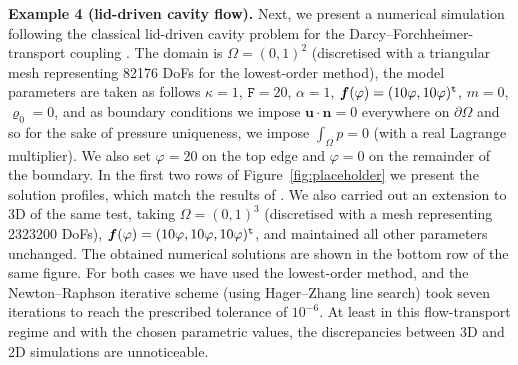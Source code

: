 \documentclass[11pt, reqno, a4paper, twoside]{article}
\newcommand{\bn}{\boldsymbol{n}}
\newcommand{\bu}{\boldsymbol{u}}
\renewcommand{\bf}{\boldsymbol{f}}
\newcommand{\rF}{\mathtt{F}}
\numberwithin{equation}{section}
\numberwithin{remark}{section}
\numberwithin{figure}{section}
\numberwithin{table}{section}
\begin{document}

\smallskip
\noindent\textbf{Example 4 (lid-driven cavity flow).} {Next, we present a numerical simulation following the classical lid-driven cavity problem for the Darcy--Forchheimer-transport coupling \cite{sayah2021finite}. The domain is $\Omega = (0,1)^2$ (discretised with a triangular mesh representing 82176 DoFs for the lowest-order method), the model parameters are taken as follows $\kappa = 1$, $\rF = 20$, $\alpha = 1$, $\bf(\varphi) = (10\varphi,10\varphi)^{\tt t}$, $m = 0$, $\varrho_0 = 0$, and as boundary conditions we impose $\bu \cdot \bn = 0$ everywhere on $\partial\Omega$ and so {for the sake of pressure uniqueness,  we impose $\int_\Omega p = 0$ (with a real Lagrange multiplier). We also} set $\varphi = 20$ on the top edge and $\varphi = 0$ on the remainder of the boundary. In the first two rows of Figure~\ref{fig:placeholder} we present the solution profiles, which match the results of \cite{sayah2021finite}. We also carried out an extension to 3D of the same test, taking $\Omega = (0,1)^3$ (discretised with a mesh representing 2323200 DoFs), $\bf(\varphi) = (10\varphi,10\varphi,10\varphi)^{\tt t}$, and maintained all other parameters unchanged. The obtained numerical solutions are shown in the bottom row of the same figure. For both cases we have used the lowest-order method, and the Newton--Raphson iterative scheme (using Hager--Zhang line search) took seven  iterations to reach the prescribed tolerance of $10^{-6}$. 
At least in this flow-transport regime and with the chosen parametric values, the discrepancies between 3D and 2D simulations are unnoticeable.} 
\end{document}
